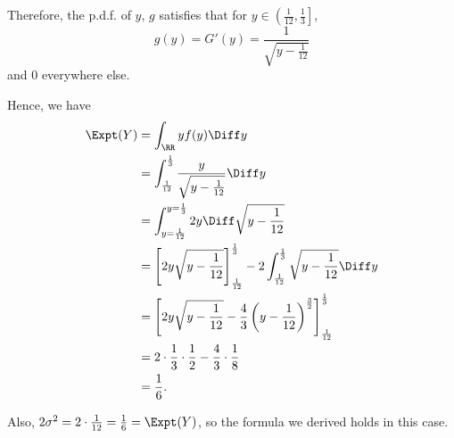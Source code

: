 Therefore, the p.d.f. of \(y\), \(g\) satisfies that for \(y \in \left(\frac{1}{12}, \frac{1}{3}\right]\),
\[
    g(y) = G'(y) = \frac{1}{\sqrt{y - \frac{1}{12}}}
\]
and \(0\) everywhere else.

Hence, we have
\begin{align*}
    \Expt(Y) &= \int_{\RR} y f(y) \Diff y\\
    &= \int_{\frac{1}{12}}^{\frac{1}{3}} \frac{y}{\sqrt{y - \frac{1}{12}}} \Diff y\\
    &= \int_{y = \frac{1}{12}}^{y = \frac{1}{3}} 2y \Diff \sqrt{y - \frac{1}{12}}\\
    &= \left[2y\sqrt{y - \frac{1}{12}}\right]_{\frac{1}{12}}^{\frac{1}{3}} - 2\int_{\frac{1}{12}}^{\frac{1}{3}} \sqrt{y - \frac{1}{12}} \Diff y\\
    &= \left[2y\sqrt{y - \frac{1}{12}} - \frac{4}{3} \left(y - \frac{1}{12}\right)^{\frac{3}{2}}\right]_{\frac{1}{12}}^{\frac{1}{3}}\\
    &= 2 \cdot \frac{1}{3} \cdot \frac{1}{2} - \frac{4}{3} \cdot \frac{1}{8}\\
    &= \frac{1}{6}.
\end{align*}

Also, \(2 \sigma^2 = 2 \cdot \frac{1}{12} = \frac{1}{6} = \Expt(Y)\), so the formula we derived holds in this case.